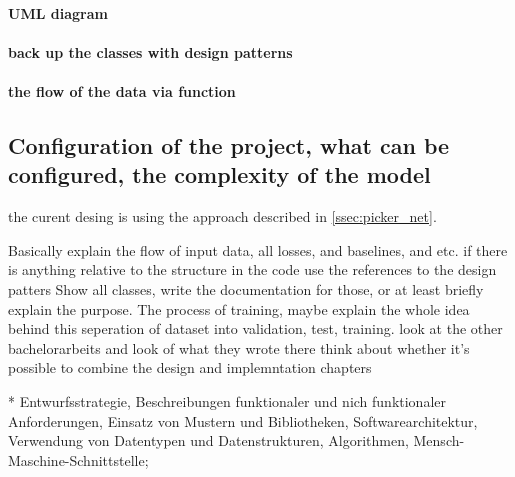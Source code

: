 \paragraph{UML diagram}
\paragraph{back up the classes with design patterns}

\paragraph{the flow of the data via function}


\subsection{Configuration of the project, what can be configured, the complexity of the model}





the curent desing is using the approach
described in \autoref{ssec:picker_net}.

Basically explain the flow of input data, all losses, and baselines, and etc.
if there is anything relative to the structure in the code use the references to the design patters
Show all classes, write the documentation for those, or at least briefly explain the purpose.
The process of training, maybe explain the whole idea behind this
	seperation of dataset into validation, test, training.
look at the other bachelorarbeits and look of what they wrote there
think about whether it's possible to combine the design and implemntation chapters



* Entwurfsstrategie, Beschreibungen funktionaler und nich
 funktionaler Anforderungen, Einsatz von Mustern und
 Bibliotheken, Softwarearchitektur, Verwendung von Datentypen und
 Datenstrukturen, Algorithmen, Mensch-Maschine-Schnittstelle;
